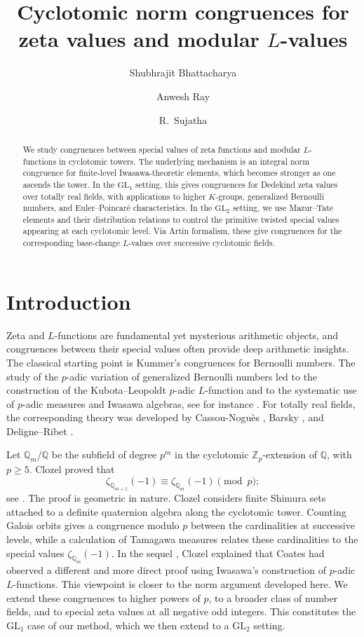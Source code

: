 \documentclass[11pt,table]{amsart}
\title[Cyclotomic norm congruences]
{Cyclotomic norm congruences for zeta values and modular $L$-values}
\author[S.~Bhattacharya]{Shubhrajit Bhattacharya}
\author[A.~Ray]{Anwesh Ray \orcidlink{0000-0001-6946-1559}}
\author[R.~Sujatha]{R.~Sujatha \orcidlink{0000-0003-1221-0710}}
\newcommand{\Q}{\mathbb{Q}}
\numberwithin{equation}{section}
\begin{document}
\begin{abstract}
We study congruences between special values of zeta functions and modular
\(L\)-functions in cyclotomic towers.  The underlying mechanism is an
integral norm congruence for finite-level Iwasawa-theoretic elements,
which becomes stronger as one ascends the tower.  In the
\(\mathrm{GL}_1\) setting, this gives congruences for Dedekind zeta
values over totally real fields, with applications to higher
\(K\)-groups, generalized Bernoulli numbers, and Euler--Poincar\'e
characteristics.  In the \(\mathrm{GL}_2\) setting, we use
Mazur--Tate elements and their distribution relations to control the
primitive twisted special values appearing at each cyclotomic level.
Via Artin formalism, these give congruences for the corresponding
base-change \(L\)-values over successive cyclotomic fields.
\end{abstract}
\maketitle

\section{Introduction}

\par Zeta and $L$-functions are fundamental yet mysterious arithmetic objects, and congruences between their special values often provide deep arithmetic insights. The classical starting point is Kummer's
congruences for Bernoulli numbers. The study of the $p$-adic variation of generalized Bernoulli numbers led to the construction of the Kubota--Leopoldt \(p\)-adic
\(L\)-function \cite{KubotaLeopoldt} and to the systematic use of
\(p\)-adic measures and Iwasawa algebras, see for instance
\cite{Iwasawa1972,Washington1997,CoatesSujatha}.  For totally real
fields, the corresponding theory was developed by Cassou-Nogu\`es
\cite{CassouNogues}, Barsky \cite{Barsky}, and Deligne--Ribet
\cite{DeligneRibet}.
\par Let \(\Q_m/\mathbb Q\) be the subfield of degree
\(p^m\) in the cyclotomic \(\mathbb Z_p\)-extension of \(\mathbb Q\),
with \(p\geq5\). Clozel proved that
\[
        \zeta_{\Q_{m+1}}(-1)
        \equiv
        \zeta_{\Q_m}(-1)
        \pmod p;
\]
see \cite[Proposition~2.5]{ClozelCyclotomic}. The proof is geometric in
nature. Clozel considers finite Shimura sets attached to a definite quaternion
algebra along the cyclotomic tower. Counting Galois orbits gives a
congruence modulo \(p\) between the cardinalities at successive levels, while
a calculation of Tamagawa measures relates these cardinalities to the
special values \(\zeta_{\Q_m}(-1)\).  In the sequel
\cite{ClozelIwasawa}, Clozel explained that Coates had observed a different and more direct proof using Iwasawa's construction of $p$-adic $L$-functions. This viewpoint is closer to the norm argument developed here. We extend these congruences to higher powers of $p$, to a broader class of number fields, and to special zeta values at all negative odd integers. This constitutes the $\mathrm{GL}_1$ case of our method, which we then extend to a $\mathrm{GL}_2$ setting.
\end{document}
